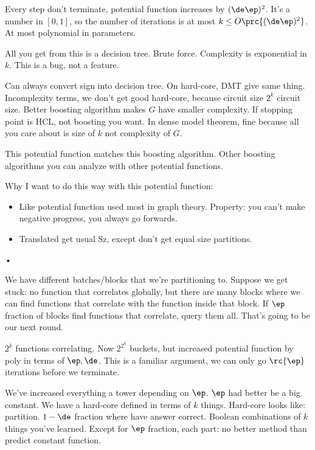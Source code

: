 Every step don't terminate, potential function increases by $(\de\ep)^2$. It's a number in $[0,1]$, so the number of iterations is at most $k\le O\prc{(\de \ep)^2}$.
At most polynomial in parameters. 


All you get from this is a decision tree. Brute force. Complexity is exponential in $k$. This is a bug, not a feature.

Can always convert sign into decision tree. On hard-core, DMT give same thing. Incomplexity terms, we don't get good hard-core, because circuit size $2^k$ circuit size. Better boosting algorithm makes $G$ have smaller complexity. If stopping point is HCL, not boosting you want. In dense model theorem, fine because all you care about is size of $k$ not complexity of $G$.

This potential function matches this boosting algorithm. Other boosting algorithms  you can analyze with other potential functions.

Why I want to do this way with this potential function:
\begin{itemize}
\item
Like potential function used most in graph theory. Property: you can't make negative progress, you always go forwards.
\item Translated get usual Sz, except don't get equal size partitions. %
\end{itemize}•

We have different batches/blocks that we're partitioning to. Suppose we get stuck: no function that correlates globally, but there are many blocks where we can find functions that correlate with the function inside that block. If $\ep$ fraction of blocks find functions that correlate, query them all. That's going to be our next round.

$2^k$ functions correlating. Now $2^{2^k}$ buckets, but increased potential function by poly in terms of $\ep,\de$. This is a familiar argument, we can only go $\rc{\ep}$ iterations before we terminate. 

We've increased everything a tower depending on $\ep$. $\ep$ had better be a big constant. We have a hard-core defined in terms of $k$ things. Hard-core looks like: partition. $1-\de$ fraction where have answer correct. Boolean combinations of $k$ things you've learned. Except for $\ep$ fraction, each part: no better method than predict constant function.

